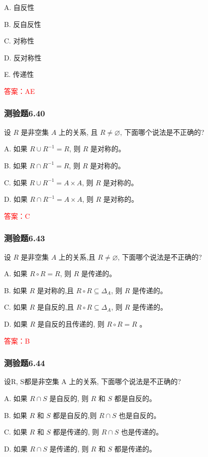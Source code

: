 \documentclass[UTF8, heading=true]{ctexart}
\begin{document}
A. 自反性

B. 反自反性

C. 对称性

D. 反对称性

E. 传递性

\textcolor{red}{答案：AE}


\subsubsection{测验题6.40}
设 $R$ 是非空集 $A$ 上的关系, 且 $R \neq \varnothing$, 下面哪个说法是不正确的?

A. 如果 $R \cup R^{-1}=R$, 则 $R$ 是对称的。

B. 如果 $R \cap R^{-1}=R$, 则 $R$ 是对称的。

C. 如果 $R \cup R^{-1}=A \times A$, 则 $R$ 是对称的。

D. 如果 $R \cap R^{-1}=A \times A$, 则 $R$ 是对称的。

\textcolor{red}{答案：C}


\subsubsection{测验题6.43}

设 $R$ 是非空集 $A$ 上的关系,且 $R \neq \varnothing$, 下面哪个说法是不正确的?

A. 
如果 $R \circ R=R$, 则 $R$ 是传递的。

B. 
如果 $R$ 是对称的,且 $R \circ R \subseteq \Delta_A$, 则 $R$ 是传递的。

C. 
如果 $R$ 是自反的,且 $R \circ R \subseteq \Delta_A$, 则 $R$ 是传递的。

D. 
如果 $R$ 是自反的且传递的, 则 $R \circ R=R$ 。

\textcolor{red}{答案：B}

\subsubsection{测验题6.44}

设R, S都是非空集 A 上的关系, 下面哪个说法是不正确的?

A. 
如果 $R \cap S$ 是自反的, 则 $R$ 和 $S$ 都是自反的。

B. 
如果 $R$ 和 $S$ 都是自反的,则 $R \cap S$ 也是自反的。

C. 
如果 $R$ 和 $S$ 都是传递的, 则 $R \cap S$ 也是传递的。

D. 
如果 $R \cap S$ 是传递的, 则 $R$ 和 $S$ 都是传递的。
\end{document}
